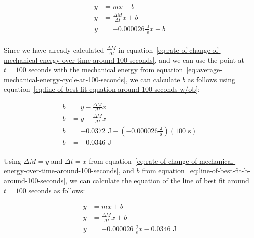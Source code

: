 \documentclass{article}
\begin{document}
            \begin{equation}
                \begin{aligned}
                    y &= mx + b \\
                    y &= \frac{\Delta M}{\Delta t}x + b \\
                    y &= -0.000026 \frac{\text{ J}}{\text{ s}}x + b \\
                \end{aligned}\label{eq:line-of-best-fit-equation-around-100-seconds-w/ob}
            \end{equation}
            
            Since we have already calculated $\frac{\Delta M}{\Delta t}$ in equation~\ref{eq:rate-of-change-of-mechanical-energy-over-time-around-100-seconds}, and we can use the point at $t = 100$ seconds with the mechanical energy from equation~\ref{eq:average-mechanical-energy-cycle-at-100-seconds}, we can calculate $b$ as follows using equation~\ref{eq:line-of-best-fit-equation-around-100-seconds-w/ob}:
            
            \begin{equation}
                \begin{aligned}
                    b &= y - \frac{\Delta M}{\Delta t}x \\
                    b &= y - \frac{\Delta M}{\Delta t}x \\
                    b &= -0.0372 \text{ J} - (-0.000026 \frac{\text{ J}}{\text{ s}})(100 \text{ s}) \\
                    b &= -0.0346 \text{ J} \\
                \end{aligned}\label{eq:line-of-best-fit-b-around-100-seconds}
            \end{equation}
            
            Using $\Delta M = y$ and $\Delta t = x$ from equation~\ref{eq:rate-of-change-of-mechanical-energy-over-time-around-100-seconds}, and $b$ from equation~\ref{eq:line-of-best-fit-b-around-100-seconds}, we can calculate the equation of the line of best fit around $t=100$ seconds as follows:
            
            \begin{equation}
                \begin{aligned}
                    y &= mx + b \\
                    y &= \frac{\Delta M}{\Delta t}x + b \\
                    y &= -0.000026 \frac{\text{ J}}{\text{ s}}x - 0.0346 \text{ J} \\
                \end{aligned}\label{eq:line-of-best-fit-equation-around-100-seconds}
            \end{equation}
            
\end{document}
